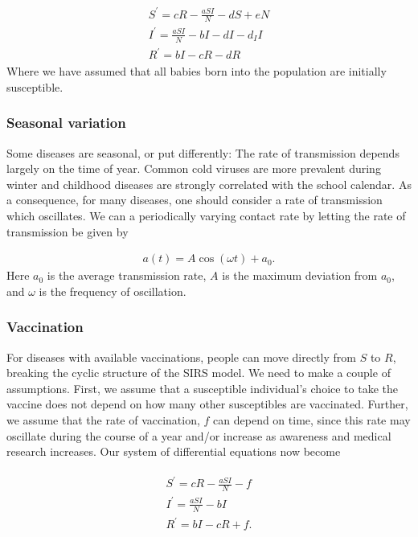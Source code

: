 \documentclass[../main.tex]{subfiles}
\begin{document}
\begin{align}
    \begin{split}
        S^{'}=cR-\frac{aSI}{N}-dS+eN \\
        I^{'}=\frac{aSI}{N}-bI-dI-d_II \\
        R^{'}=bI-cR-dR
    \end{split}
\end{align} Where we have assumed that all babies born into the population are initially susceptible. 

\subsubsection{Seasonal variation}
Some diseases are seasonal, or put differently: The rate of transmission depends largely on the time of year. Common cold viruses are more prevalent during winter and childhood diseases are strongly correlated with the school calendar.  As a consequence, for many diseases, one should consider a rate of transmission which oscillates. We can a periodically varying contact rate by letting the rate of transmission be given by

\begin{align}
    a(t)=A\cos(\omega t)+a_0.
\end{align} Here $a_0$ is the average transmission rate, $A$ is the maximum deviation from $a_0$, and $\omega$ is the frequency of oscillation. 

\subsubsection{Vaccination}
For diseases with available vaccinations, people can move directly from $S$ to $R$, breaking the cyclic structure of the SIRS model. We need to make a couple of assumptions. First, we assume that a susceptible individual's choice to take the vaccine does not depend on how many other susceptibles are vaccinated. Further, we assume that the rate of vaccination, $f$ can depend on time, since this rate may oscillate during the course of a year and/or increase as awareness and medical research increases. Our system of differential equations now become

\begin{align}
    \begin{split}
        S^{'}=cR-\frac{aSI}{N}-f \\
        I^{'}=\frac{aSI}{N}-bI \\
        R^{'}=bI-cR+f.
    \end{split}
\end{align}
\end{document}
